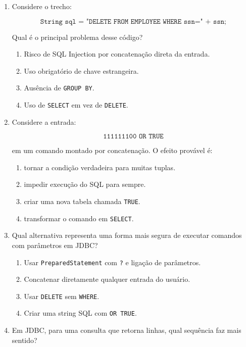 \documentclass[12pt,a4paper]{article}
\begin{document}
\begin{enumerate}[resume,label=\textbf{Q\arabic*.}]

\item Considere o trecho:

\[
\texttt{String sql = "DELETE FROM EMPLOYEE WHERE ssn=" + ssn;}
\]

Qual é o principal problema desse código?

\begin{enumerate}[label=\alph*)]
    \item Risco de SQL Injection por concatenação direta da entrada.
    \item Uso obrigatório de chave estrangeira.
    \item Ausência de \texttt{GROUP BY}.
    \item Uso de \texttt{SELECT} em vez de \texttt{DELETE}.
\end{enumerate}

\item Considere a entrada:

\[
\texttt{111111100 OR TRUE}
\]

em um comando montado por concatenação. O efeito provável é:

\begin{enumerate}[label=\alph*)]
    \item tornar a condição verdadeira para muitas tuplas.
    \item impedir execução do SQL para sempre.
    \item criar uma nova tabela chamada \texttt{TRUE}.
    \item transformar o comando em \texttt{SELECT}.
\end{enumerate}

\item Qual alternativa representa uma forma mais segura de executar comandos com parâmetros em JDBC?

\begin{enumerate}[label=\alph*)]
    \item Usar \texttt{PreparedStatement} com \texttt{?} e ligação de parâmetros.
    \item Concatenar diretamente qualquer entrada do usuário.
    \item Usar \texttt{DELETE} sem \texttt{WHERE}.
    \item Criar uma string SQL com \texttt{OR TRUE}.
\end{enumerate}

\item Em JDBC, para uma consulta que retorna linhas, qual sequência faz mais sentido?


\end{enumerate}
\end{document}
